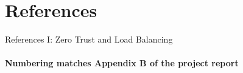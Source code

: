 \documentclass[aspectratio=169, 11pt]{beamer}
\begin{document}
\section{References}

\begin{frame}[allowframebreaks]{References I: Zero Trust and Load Balancing}
    \framesubtitle{Numbering matches Appendix B of the project report}
    \scriptsize


\end{frame}
\end{document}
